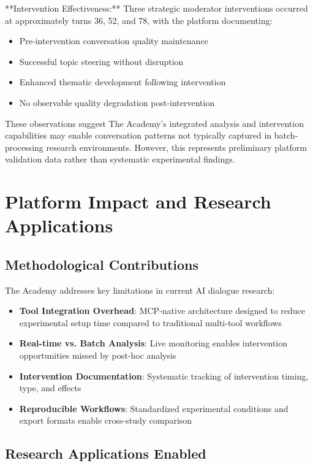 \documentclass[11pt,letterpaper]{article}
\newcommand{\theacademy}{The Academy}
\newcommand{\mcp}{MCP}
\begin{document}
**Intervention Effectiveness:**
Three strategic moderator interventions occurred at approximately turns 36, 52, and 78, with the platform documenting:
\begin{itemize}
    \item Pre-intervention conversation quality maintenance
    \item Successful topic steering without disruption
    \item Enhanced thematic development following intervention
    \item No observable quality degradation post-intervention
\end{itemize}

These observations suggest \theacademy{}'s integrated analysis and intervention capabilities may enable conversation patterns not typically captured in batch-processing research environments. However, this represents preliminary platform validation data rather than systematic experimental findings.

\section{Platform Impact and Research Applications}

\subsection{Methodological Contributions}

\theacademy{} addresses key limitations in current AI dialogue research:

\begin{itemize}
    \item \textbf{Tool Integration Overhead}: \mcp{}-native architecture designed to reduce experimental setup time compared to traditional multi-tool workflows
    \item \textbf{Real-time vs. Batch Analysis}: Live monitoring enables intervention opportunities missed by post-hoc analysis
    \item \textbf{Intervention Documentation}: Systematic tracking of intervention timing, type, and effects
    \item \textbf{Reproducible Workflows}: Standardized experimental conditions and export formats enable cross-study comparison
\end{itemize}

\subsection{Research Applications Enabled}
\end{document}
